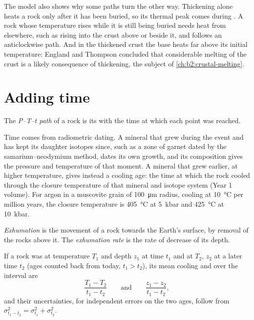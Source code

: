 The model also shows why some paths turn the other way. Thickening alone heats a rock
only after it has been buried, so its thermal peak comes during . A rock whose
temperature rises while it is still being buried needs heat from elsewhere, such as 
rising into the crust above or beside it, and follows an anticlockwise path. And in the
thickened crust the base heats far above its initial temperature: England and Thompson
concluded that considerable melting of the crust is a likely consequence of thickening,
the subject of \cref{ch:b2:crustal-melting}.

\section{Adding time}\label{sec:b2:pt-paths:time}

\begin{definition}[P--T--t path]\label{def:b2:pt-paths:ptt}
The \emph{P--T--t path} of a rock is its  with the time at
which each point was reached.
\end{definition}

Time comes from radiometric dating. A mineral that grew during the event and has kept
its daughter isotopes since, such as a zone of garnet dated by the
samarium--neodymium method, dates its own growth, and its
composition gives the pressure and temperature of that moment. A mineral that grew
earlier, at higher temperature, gives instead a cooling age: the time at which the rock
cooled through the closure temperature of that mineral and isotope system (Year 1
volume). For argon in a muscovite grain of \qty{100}{\micro m} radius, cooling at
\qty{10}{\celsius} per million years, the closure temperature is \qty{405}{\celsius} at
\qty{5}{kbar} and \qty{425}{\celsius} at \qty{10}{kbar}.

\begin{definition}\label{def:b2:pt-paths:exhumation}
\emph{Exhumation} is the movement of a rock towards the Earth's surface,
by removal of the rocks above it. The \emph{exhumation rate} is the
rate of decrease of its depth.
\end{definition}

\begin{proposition}\label{prop:b2:pt-paths:rates}
If a rock was at temperature $T_1$ and depth $z_1$ at time $t_1$ and at $T_2$, $z_2$ at a
later time $t_2$ (ages counted back from today, $t_1 > t_2$), its mean cooling and
 over the interval are
\[
\frac{T_1 - T_2}{t_1 - t_2}
\qquad\text{and}\qquad
\frac{z_1 - z_2}{t_1 - t_2},
\]
and their uncertainties, for independent errors on the two ages, follow from
$\sigma_{t_1 - t_2}^2 = \sigma_{t_1}^2 + \sigma_{t_2}^2$.
\end{proposition}

